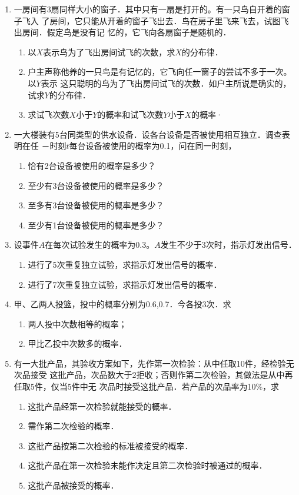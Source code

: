 \documentclass[10pt,a4paper]{article}
\begin{document}
\begin{enumerate}
    \item 一房间有3扇同样大小的窗子．其中只有一扇是打开的。有一只鸟自开着的窗子飞入
    了房间，它只能从开着的窗子飞出去．鸟在房子里飞来飞去，试图飞出房间．假定鸟是没有记
    忆的，它飞向各扇窗子是随机的．
    \begin{enumerate}
        \item 以$X$表示鸟为了飞出房间试飞的次数，求$X$的分布律．
        \item 户主声称他养的一只鸟是有记忆的，它飞向任一窗子的尝试不多于一次。以$Y$表示
        这只聪明的鸟为了飞出房间试飞的次数．如户主所说是确实的，试求$Y$的分布律．
        \item 求试飞次数$X$小于$Y$的概率和试飞次数$Y$小于$X$的概率·
    \end{enumerate}


    \item 一大楼装有5台同类型的供水设备．设各台设备是否被使用相互独立．调查表明在任
    －时刻$t$每台设备被使用的概率为0.1，问在同一时刻，
    \begin{enumerate}
        \item 恰有2台设备被使用的概率是多少？
        \item 至少有3台设备被使用的概率是多少？
        \item 至多有3台设备被使用的概率是多少？
        \item 至少有1台设备被使用的概率是多少？
    \end{enumerate}


    \item 设事件$A$在每次试验发生的概率为0.3。$A$发生不少于3次时，指示灯发出信号．
    \begin{enumerate}
        \item 进行了5次重复独立试验，求指示灯发出信号的概率．
        \item 进行了7次重复独立试验，求指示灯发出信号的概率．
    \end{enumerate}


    \item 甲、乙两人投篮，投中的概率分别为0.6,0.7．今各投3次．求
    \begin{enumerate}
        \item 两人投中次数相等的概率；
        \item 甲比乙投中次数多的概率．
    \end{enumerate}


    \item 有一大批产品，其验收方案如下，先作第一次检验：从中任取10件，经检验无次品接受
    这批产品，次品数大于2拒收；否则作第二次检验，其做法是从中再任取5件，仅当5件中无
    次品时接受这批产品．若产品的次品率为10\%，求
    \begin{enumerate}
        \item 这批产品经第一次检验就能接受的概率．
        \item 需作第二次检验的概率．
        \item 这批产品按第二次检验的标准被接受的概率．
        \item 这批产品在第一次检验未能作决定且第二次检验时被通过的概率．
        \item 这批产品被接受的概率．
    \end{enumerate}



\end{enumerate}
\end{document}
